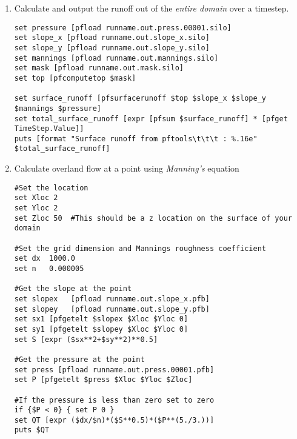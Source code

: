 \begin{enumerate}
\item Calculate and output the runoff out of the \emph{entire domain} over a timestep.
\begin{display}\begin{verbatim}
set pressure [pfload runname.out.press.00001.silo]
set slope_x [pfload runname.out.slope_x.silo]
set slope_y [pfload runname.out.slope_y.silo]
set mannings [pfload runname.out.mannings.silo]
set mask [pfload runname.out.mask.silo]
set top [pfcomputetop $mask]

set surface_runoff [pfsurfacerunoff $top $slope_x $slope_y $mannings $pressure]
set total_surface_runoff [expr [pfsum $surface_runoff] * [pfget TimeStep.Value]]
puts [format "Surface runoff from pftools\t\t\t : %.16e" $total_surface_runoff]
\end{verbatim}\end{display}

\item Calculate overland flow at a point using \emph{Manning's} equation
\begin{display}\begin{verbatim}
#Set the location
set Xloc 2
set Yloc 2
set Zloc 50  #This should be a z location on the surface of your domain

#Set the grid dimension and Mannings roughness coefficient
set dx  1000.0
set n   0.000005

#Get the slope at the point
set slopex   [pfload runname.out.slope_x.pfb]
set slopey   [pfload runname.out.slope_y.pfb]
set sx1 [pfgetelt $slopex $Xloc $Yloc 0]
set sy1 [pfgetelt $slopey $Xloc $Yloc 0]
set S [expr ($sx**2+$sy**2)**0.5]

#Get the pressure at the point
set press [pfload runname.out.press.00001.pfb]
set P [pfgetelt $press $Xloc $Yloc $Zloc]

#If the pressure is less than zero set to zero
if {$P < 0} { set P 0 }
set QT [expr ($dx/$n)*($S**0.5)*($P**(5./3.))]
puts $QT
\end{verbatim}\end{display}

\end{enumerate}



